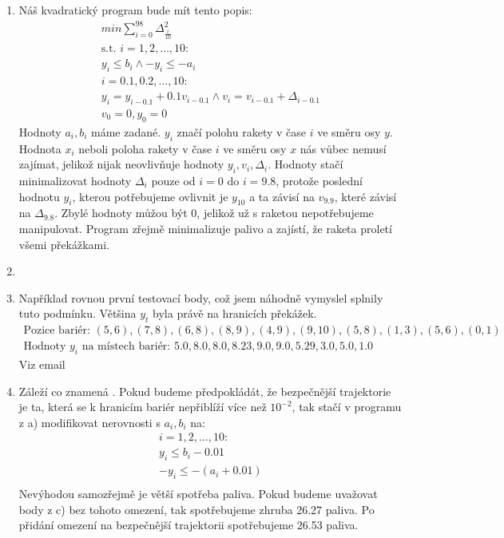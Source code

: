 \documentclass[12pt, a4paper]{article}
\begin{document}
\section{}
\begin{enumerate}[label=\alph*)]
\item Náš kvadratický program bude mít tento popis:
\begin{gather*}
min \sum_{i=0}^{98} \Delta_{\frac{i}{10}}^2\\
\text{s.t. } i=1,2,\dots,10:\\
y_i \leq b_i \land -y_i \leq -a_i\\
i=0.1,0.2,\dots, 10:\\
y_i = y_{i-0.1}+0.1v_{i-0.1} \land  v_i = v_{i-0.1}+\Delta_{i-0.1}\\
v_0 = 0, y_0 = 0
\end{gather*}
Hodnoty $a_i,b_i$ máme zadané. $y_i$ značí polohu rakety v čase $i$ ve směru osy $y$. Hodnota $x_i$ neboli poloha rakety v čase $i$ ve směru osy $x$ nás vůbec nemusí zajímat, jelikož nijak neovlivňuje hodnoty $y_i,v_i,\Delta_i$. Hodnoty stačí minimalizovat hodnoty $\Delta_i$ pouze od $i=0$ do $i=9.8$, protože poslední hodnotu $y_i$, kterou potřebujeme ovlivnit je $y_{10}$ a ta závisí na $v_{9.9}$, které závisí na $\Delta_{9.8}$. Zbylé hodnoty můžou být 0, jelikož už s raketou nepotřebujeme manipulovat. Program zřejmě minimalizuje palivo a zajístí, že raketa proletí všemi překážkami.
\item
\item Například rovnou první testovací body, což jsem náhodně vymyslel splnily tuto podmínku. Většina $y_t$ byla právě na hranicích překážek.
\begin{gather*}
\text{Pozice bariér: } (5,6), (7,8), (6,8), (8,9), (4,9), (9,10), (5,8), (1, 3), (5,6), (0,1)\\
\text{Hodnoty $y_i$ na místech bariér: } 5.0, 8.0, 8.0, 8.23, 9.0, 9.0, 5.29, 3.0, 5.0, 1.0
\end{gather*}
Viz email
\item Záleží co znamená . Pokud budeme předpokládát, že bezpečnější trajektorie je ta, která se k hranicím bariér nepřiblíží více než $10^{-2}$, tak stačí v programu z a) modifikovat nerovnosti s $a_i, b_i$ na:
\begin{gather*}
i=1,2,\dots,10:\\
y_i \leq b_i - 0.01\\
-y_i \leq -(a_i+0.01)\\
\end{gather*}
Nevýhodou samozřejmě je větší spotřeba paliva. Pokud budeme uvažovat body z c) bez tohoto omezení, tak spotřebujeme zhruba 26.27 paliva. Po přidání omezení na bezpečnější trajektorii spotřebujeme 26.53 paliva.
\end{enumerate}
\end{document}
